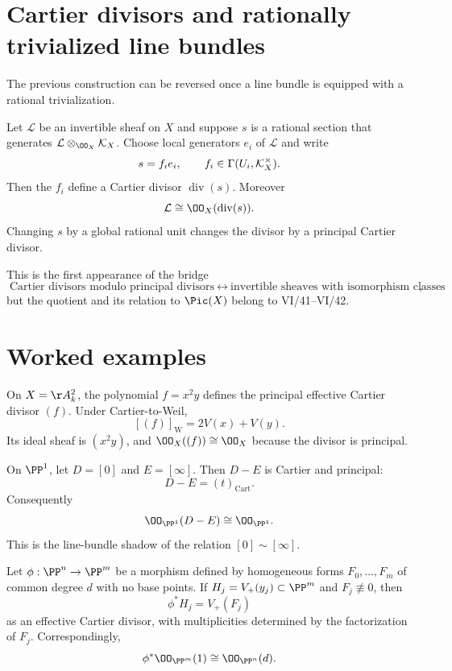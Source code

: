 \section{Cartier divisors and rationally trivialized line bundles}
The previous construction can be reversed once a line bundle is equipped with a rational trivialization.

\begin{proposition}\label{prop:vi40-rational-trivialization}
Let \(\mathcal L\) be an invertible sheaf on \(X\) and suppose \(s\) is a rational section that generates \(\mathcal L\otimes_{\OO_X}\KX\).  Choose local generators \(e_i\) of \(\mathcal L\) and write
\[
 s=f_i e_i,
 \qquad f_i\in\Gamma(U_i,\mathcal{K}_X^\times).
\]
Then the \(f_i\) define a Cartier divisor \(\operatorname{div}(s)\).  Moreover
\[
 \mathcal L\cong\OO_X(\operatorname{div}(s)).
\]
Changing \(s\) by a global rational unit changes the divisor by a principal Cartier divisor.
\end{proposition}

This is the first appearance of the bridge
\[
 \boxed{\text{Cartier divisors modulo principal divisors}\ \longleftrightarrow\ \text{invertible sheaves with isomorphism classes}},
\]
but the quotient and its relation to \(\Pic(X)\) belong to VI/41--VI/42.



\section{Worked examples}
\begin{example}[A divisor on \(\AA^2\)]\label{ex:vi40-worked-affine}
On \(X=\AA^2_k\), the polynomial \(f=x^2y\) defines the principal effective Cartier divisor \((f)\).  Under Cartier-to-Weil,
\[
 [(f)]_{\mathrm W}=2V(x)+V(y).
\]
Its ideal sheaf is \((x^2y)\), and \(\OO_X((f))\cong\OO_X\) because the divisor is principal.
\end{example}

\begin{example}\label{ex:vi40-difference}
On \(\PP^1\), let \(D=[0]\) and \(E=[\infty]\).  Then \(D-E\) is Cartier and principal:
\[
 D-E=(t)_{\mathrm{Cart}}.
\]
Consequently
\[
 \OO_{\PP^1}(D-E)\cong\OO_{\PP^1}.
\]
This is the line-bundle shadow of the relation \([0]\sim[\infty]\).
\end{example}

\begin{example}\label{ex:vi40-pullback-hyperplane}
Let \(\phi:\PP^n\to\PP^m\) be a morphism defined by homogeneous forms \(F_0,\ldots,F_m\) of common degree \(d\) with no base points.  If \(H_j=V_+(y_j)\subset\PP^m\) and \(F_j\not\equiv0\), then
\[
 \phi^*H_j=V_+(F_j)
\]
as an effective Cartier divisor, with multiplicities determined by the factorization of \(F_j\).  Correspondingly,
\[
 \phi^*\OO_{\PP^m}(1)\cong\OO_{\PP^n}(d).
\]
\end{example}

